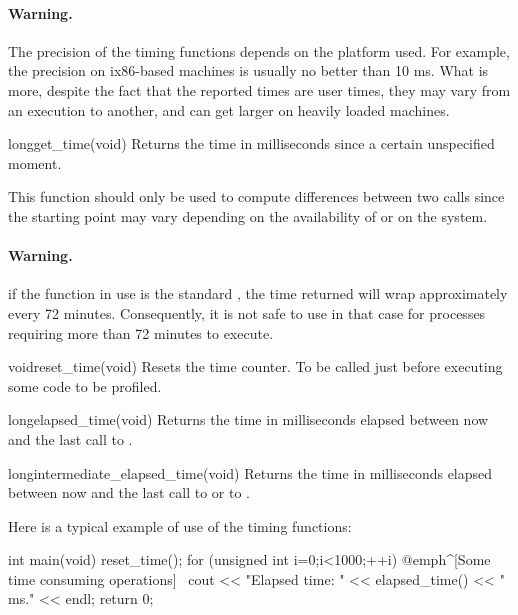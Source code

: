 \documentclass{manual}
\begin{document}
\paragraph*{Warning.} The precision of the timing functions depends on the platform
used. For example, the precision on ix86-based machines is usually no better
than 10 ms. What is more, despite the fact that the reported times are user
times, they may vary from an execution to another, and can get larger on
heavily loaded machines.


\begin{deffun}{long}{get\_time}{(void)}
Returns the time in milliseconds since a certain unspecified moment.

This function should only be used to compute differences between two
calls since the starting point may vary depending on the availability of
 or  on the system.


\paragraph*{Warning.} if the function in use is the standard ,
the time returned will wrap approximately every 72 minutes. Consequently, it is
not safe to use  in that case for processes requiring more than
72 minutes to execute.
\end{deffun}


\begin{deffun}{void}{reset\_time}{(void)}
  Resets the time counter. To be called just before executing some code to be
  profiled.
\end{deffun}

\begin{deffun}{long}{elapsed\_time}{(void)}
  Returns the time in milliseconds elapsed between now and the last call to
  .
\end{deffun}

\begin{deffun}{long}{intermediate\_elapsed\_time}{(void)}
  Returns the time in milliseconds elapsed between now and the last call to
   or to .
\end{deffun}

Here is a typical example of use of the timing functions:

\begin{example}
int main(void)
{
  reset_time();
  for (unsigned int i=0;i<1000;++i) {
     @emph^[Some time consuming operations]~
  }
  cout << "Elapsed time: " << elapsed_time() << " ms." << endl;
  return 0;
}
\end{example}
\end{document}
